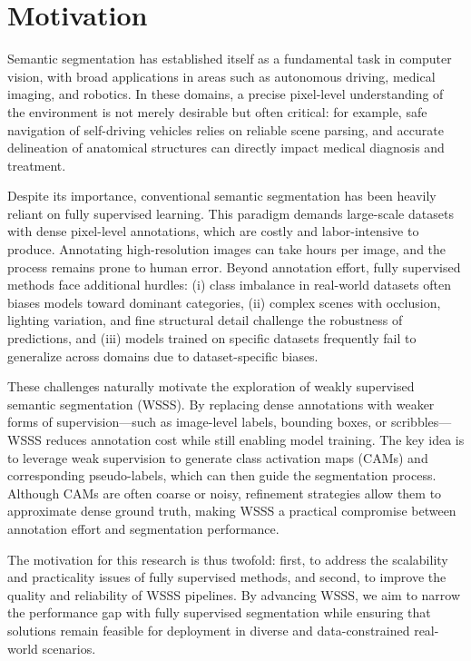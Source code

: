 \section{Motivation}
\label{sec:motivation}

Semantic segmentation has established itself as a fundamental task in computer vision, with broad applications in areas such as autonomous driving, medical imaging, and robotics. In these domains, a precise pixel-level understanding of the environment is not merely desirable but often critical: for example, safe navigation of self-driving vehicles relies on reliable scene parsing, and accurate delineation of anatomical structures can directly impact medical diagnosis and treatment.

Despite its importance, conventional semantic segmentation has been heavily reliant on fully supervised learning. This paradigm demands large-scale datasets with dense pixel-level annotations, which are costly and labor-intensive to produce. Annotating high-resolution images can take hours per image, and the process remains prone to human error. Beyond annotation effort, fully supervised methods face additional hurdles: (i) class imbalance in real-world datasets often biases models toward dominant categories, (ii) complex scenes with occlusion, lighting variation, and fine structural detail challenge the robustness of predictions, and (iii) models trained on specific datasets frequently fail to generalize across domains due to dataset-specific biases.

These challenges naturally motivate the exploration of weakly supervised semantic segmentation (WSSS). By replacing dense annotations with weaker forms of supervision—such as image-level labels, bounding boxes, or scribbles—WSSS reduces annotation cost while still enabling model training. The key idea is to leverage weak supervision to generate class activation maps (CAMs) and corresponding pseudo-labels, which can then guide the segmentation process. Although CAMs are often coarse or noisy, refinement strategies allow them to approximate dense ground truth, making WSSS a practical compromise between annotation effort and segmentation performance.

The motivation for this research is thus twofold: first, to address the scalability and practicality issues of fully supervised methods, and second, to improve the quality and reliability of WSSS pipelines. By advancing WSSS, we aim to narrow the performance gap with fully supervised segmentation while ensuring that solutions remain feasible for deployment in diverse and data-constrained real-world scenarios.



